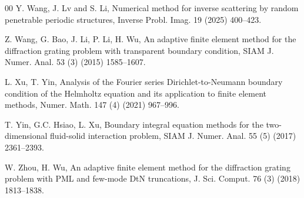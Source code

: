 \documentclass[final,3p,times]{elsarticle}
\begin{document}
\begin{thebibliography}{00}
 Y. Wang, J. Lv and S. Li, Numerical method for inverse scattering by random penetrable periodic structures, Inverse Probl. Imag. 19 (2025) 400--423.

 Z. Wang, G. Bao, J. Li, P. Li, H. Wu,  An adaptive finite element method for the diffraction grating problem with transparent boundary condition, SIAM J. Numer. Anal. 53 (3) (2015) 1585--1607.

 L. Xu, T. Yin, Analysis of the Fourier series Dirichlet-to-Neumann boundary condition of the Helmholtz equation and its application to finite element methods, Numer. Math. 147 (4)  (2021) 967--996.

 T. Yin, G.C. Hsiao, L. Xu, Boundary integral equation methods for the two-dimensional fluid-solid interaction problem, SIAM J. Numer. Anal. 55 (5)  (2017) 2361--2393.

 W. Zhou, H. Wu, An adaptive finite element method for the diffraction grating problem with PML and few-mode DtN truncations, J. Sci. Comput. 76 (3) (2018) 1813--1838.

\end{thebibliography}
\end{document}
